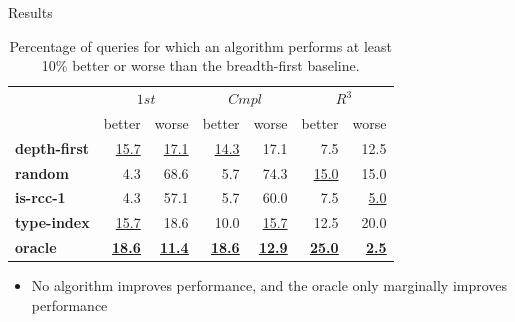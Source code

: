 \begin{frame}{Results}
  \small %
  \captionsetup[table]{skip=10pt, font=footnotesize }
  \begin{table}[!ht]
    \centering
    \begin{adjustbox}{width=0.9\textwidth} %
      \begin{tabular}{l|rr|rr|rr}
        & \multicolumn{2}{c}{$1st$} & \multicolumn{2}{c}{$Cmpl$} & \multicolumn{2}{c}{$R^{3}$} \\
        & better & worse & better & worse & better & worse  \\
        \midrule
        \bf depth-first & \underline{15.7} & \underline{17.1} & \underline{14.3} & 17.1 & 7.5 & 12.5  \\
        \bf random & 4.3 & 68.6 & 5.7 & 74.3 & \underline{15.0} & 15.0 \\
        \hline
        \bf is-rcc-1 & 4.3 & 57.1 & 5.7 & 60.0 & 7.5 & \underline{5.0} \\
        \hline
        \bf type-index & \underline{15.7} & 18.6 & 10.0 & \underline{15.7} & 12.5 & 20.0 \\
        \hline
        \bf oracle & \underline{\underline{\textbf{18.6}}} & \underline{\underline{\textbf{11.4}}} 
        & \underline{\underline{\textbf{18.6}}} & \underline{\underline{\textbf{12.9}}} 
        & \underline{\underline{\textbf{25.0}}} & \underline{\underline{\textbf{2.5}}} \\
      \end{tabular}
    \end{adjustbox}
    \caption{Percentage of queries for which an algorithm performs at least 10\% better or worse than the breadth-first baseline.}
  \end{table}
  \begin{itemize}
    \item No algorithm improves performance, and the oracle only marginally improves performance
  \end{itemize}
\end{frame}